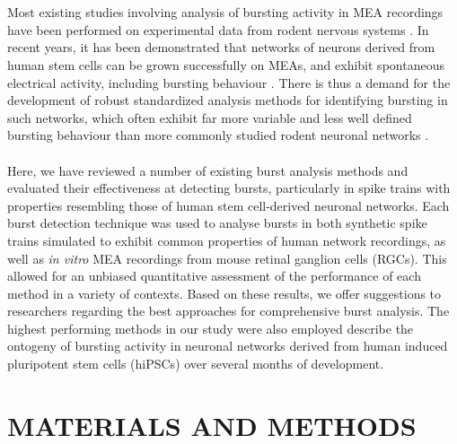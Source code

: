 \documentclass[12pt, titlepage]{article}
\begin{document}
	\\ \\ Most existing studies involving analysis of bursting activity in MEA recordings have been performed on experimental data from rodent nervous systems \cite{Charlesworth2015,Mazzoni2007}. In recent years, it has been demonstrated that networks of neurons derived from human stem cells can be grown successfully on MEAs, and exhibit spontaneous electrical activity, including bursting behaviour \cite{Illes2007,Heikkila2009}. %
	There is thus a demand for the development of robust standardized analysis methods for identifying bursting in such networks, which often exhibit far more variable and less well defined bursting behaviour than more commonly studied rodent neuronal networks \cite{Kapucu2012}.
	\\ \\ Here, we have reviewed a number of existing burst analysis methods and evaluated their effectiveness at detecting bursts, particularly in spike trains with properties resembling those of human stem cell-derived neuronal networks. Each burst detection technique was used to analyse bursts in both synthetic spike trains simulated to exhibit common properties of human network recordings, as well as \textit{in vitro} MEA recordings from mouse retinal ganglion cells (RGCs). This allowed for an unbiased quantitative assessment of the performance of each method in a variety of contexts. Based on these results, we offer suggestions to researchers regarding the best approaches for comprehensive burst analysis. The highest performing methods in our study were also employed describe the ontogeny of bursting activity in neuronal networks derived from human induced pluripotent stem cells (hiPSCs) over several months of development. 
	\section*{MATERIALS AND METHODS}
\end{document}
